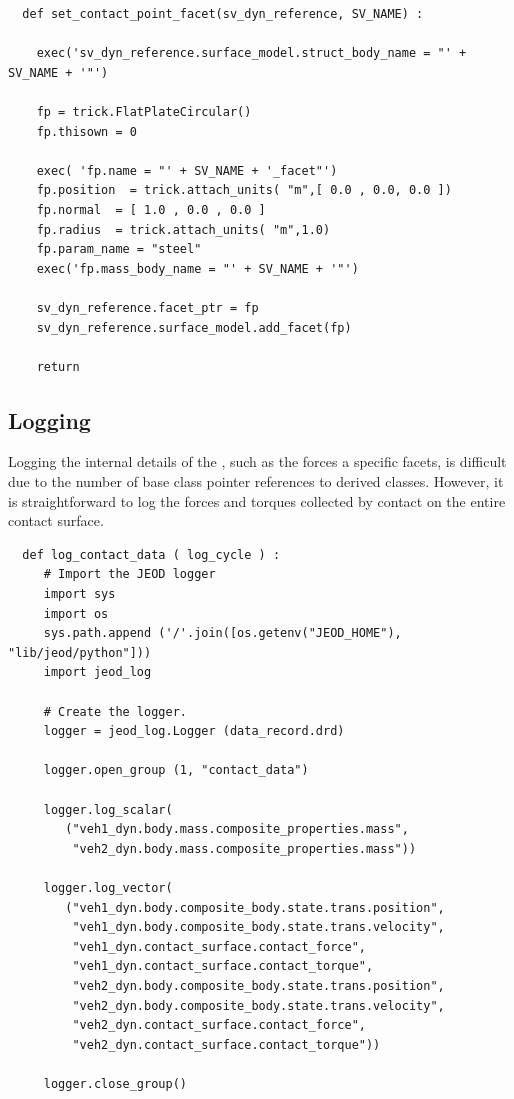 \begin{verbatim}
  def set_contact_point_facet(sv_dyn_reference, SV_NAME) :

    exec('sv_dyn_reference.surface_model.struct_body_name = "' + SV_NAME + '"')

    fp = trick.FlatPlateCircular()
    fp.thisown = 0

    exec( 'fp.name = "' + SV_NAME + '_facet"')
    fp.position  = trick.attach_units( "m",[ 0.0 , 0.0, 0.0 ])
    fp.normal  = [ 1.0 , 0.0 , 0.0 ]
    fp.radius  = trick.attach_units( "m",1.0)
    fp.param_name = "steel"
    exec('fp.mass_body_name = "' + SV_NAME + '"')

    sv_dyn_reference.facet_ptr = fp
    sv_dyn_reference.surface_model.add_facet(fp)

    return
\end{verbatim}

\subsection{Logging}
Logging the internal details of the \ModelDesc, such as the forces a specific facets, is difficult due to the number of base class pointer references to derived classes.  However, it is straightforward to log the forces and torques collected by contact on the entire contact surface.
\begin{verbatim}
  def log_contact_data ( log_cycle ) :
     # Import the JEOD logger
     import sys
     import os
     sys.path.append ('/'.join([os.getenv("JEOD_HOME"), "lib/jeod/python"]))
     import jeod_log

     # Create the logger.
     logger = jeod_log.Logger (data_record.drd)

     logger.open_group (1, "contact_data")

     logger.log_scalar(
        ("veh1_dyn.body.mass.composite_properties.mass",
         "veh2_dyn.body.mass.composite_properties.mass"))

     logger.log_vector(
        ("veh1_dyn.body.composite_body.state.trans.position",
         "veh1_dyn.body.composite_body.state.trans.velocity",
         "veh1_dyn.contact_surface.contact_force",
         "veh1_dyn.contact_surface.contact_torque",
         "veh2_dyn.body.composite_body.state.trans.position",
         "veh2_dyn.body.composite_body.state.trans.velocity",
         "veh2_dyn.contact_surface.contact_force",
         "veh2_dyn.contact_surface.contact_torque"))

     logger.close_group()
\end{verbatim}

